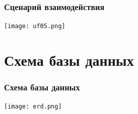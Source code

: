 \documentclass[12pt]{beamer}
\begin{document}
    \begin{frame}
    \frametitle{Сценарий взаимодействия}
        \begin{center}
            \texttt{[image: uf05.png]}
        \end{center}
    \end{frame}

    \section{Схема базы данных}
    \begin{frame}
    \frametitle{Схема базы данных}
        \begin{center}
            \texttt{[image: erd.png]}
        \end{center}
    \end{frame}
\end{document}
